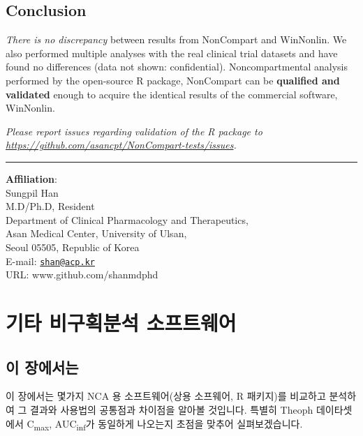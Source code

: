 \documentclass[12pt,]{krantz}
\begin{document}
\pagebreak

\hypertarget{conclusion-1}{%
\section{Conclusion}\label{conclusion-1}}

\emph{There is no discrepancy} between results from NonCompart and WinNonlin. We also performed multiple analyses with the real clinical trial datasets and have found no differences (data not shown: confidential). Noncompartmental analysis performed by the open-source R package, NonCompart can be \textbf{qualified and validated} enough to acquire the identical results of the commercial software, WinNonlin.

\emph{Please report issues regarding validation of the R package to \url{https://github.com/asancpt/NonCompart-tests/issues}.}

\begin{center}\rule{0.5\linewidth}{\linethickness}\end{center}

\textbf{Affiliation}:\\
Sungpil Han\\
M.D/Ph.D, Resident\\
Department of Clinical Pharmacology and Therapeutics,\\
Asan Medical Center, University of Ulsan,\\
Seoul 05505, Republic of Korea\\
E-mail: \href{mailto:shan@acp.kr}{\nolinkurl{shan@acp.kr}}\\
URL: www.github.com/shanmdphd

\pagebreak

\hypertarget{softwares}{%
\chapter{기타 비구획분석 소프트웨어}\label{softwares}}

\hypertarget{detailschapter}{%
\section{이 장에서는}\label{detailschapter}}

이 장에서는 몇가지 NCA 용 소프트웨어(상용 소프웨어, R 패키지)를 비교하고 분석하여 그 결과와 사용법의 공통점과 차이점을 알아볼 것입니다.
특별히 Theoph 데이타셋에서 C\textsubscript{max}, AUC\textsubscript{inf}가 동일하게 나오는지 초점을 맞추어 실펴보겠습니다.
\end{document}
